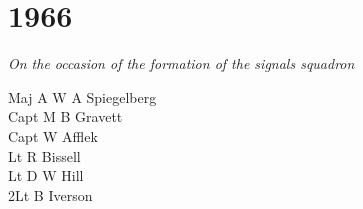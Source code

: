 \chapter*{1966}

\begin{center}
  \textit{On the occasion of the formation of the signals squadron}
\end{center}

\begin{multicols}{2}
  \noindent
  Maj A W A Spiegelberg \\
  Capt M B Gravett \\
  Capt W Afflek \\
  Lt R Bissell \\
  Lt D W Hill \\
  2Lt B Iverson \\
\end{multicols}

